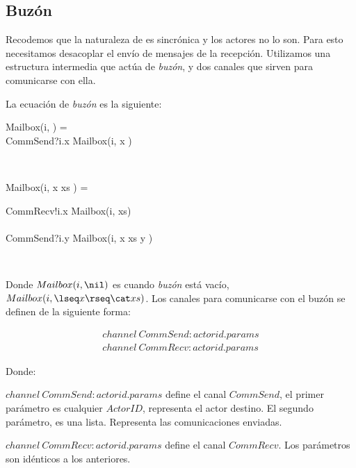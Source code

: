 \subsection{Buzón}\label{modelo:buzon}

Recodemos que la naturaleza de \CSP es sincrónica y los actores no lo son. Para esto necesitamos desacoplar el envío de mensajes de la recepción. Utilizamos una estructura intermedia que actúa de \textit{buzón}, y dos canales que sirven para comunicarse con ella.

La ecuación de \textit{buzón} es la siguiente:

\begin{process}
\begin{block}
Mailbox(i, \nil) = {} \\ \quad
CommSend?i.x \then Mailbox(i, \lseq x \rseq) 
\end{block} \\

\begin{block}
Mailbox(i, \lseq x \rseq \cat xs ) = {} \\ \quad 
  \begin{block}
    CommRecv!i.x \then Mailbox(i, xs) \\
    \Extchoice \\
    CommSend?i.y \then Mailbox(i, \lseq x \rseq \cat xs \cat \lseq y \rseq ) 
  \end{block}
\end{block} \\

\end{process}

Donde $Mailbox(i, \nil)$ es cuando \textit{buzón} está vacío, $Mailbox(i, \lseq x \rseq \cat xs )$. Los canales para comunicarse con el buzón se definen de la siguiente forma:

\begin{align*}
channel\ CommSend:actorid.params \\
channel\ CommRecv:actorid.params
\end{align*}

Donde:
\begin{description}
 \item $channel\ CommSend:actorid.params$ define el canal $CommSend$, el primer parámetro es cualquier $ActorID$, representa el actor destino. El segundo parámetro, es una lista. Representa las comunicaciones enviadas. 
 \item $channel\ CommRecv:actorid.params$ define el canal $CommRecv$. Los parámetros son idénticos a los anteriores.
\end{description}

